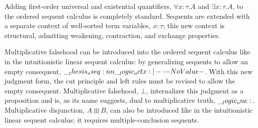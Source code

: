 Adding first-order universal and existential quantifiers, $\forall x{:}\tau.A$ and $\exists x{:}\tau.A$, to the ordered sequent calculus is completely standard.
Sequents are extended with a separate context of well-sorted term variables, $x{:}\tau$; this new context is structural, admitting weakening, contraction, and exchange properties.



Multiplicative falsehood can be introduced into
the ordered sequent calculus like in the intuitionistic linear sequent calculus\autocite{Chang+:CMU03}:
by generalizing %
sequents to %
allow
an empty consequent, $\oseq{\octx |- \cdot}$.
With this new judgment form, the cut principle and left rules must be revised to allow the empty consequent.
% 
Multiplicative falsehood, $\bot$, internalizes this judgment as a proposition and is, as its name suggests, dual to multiplicative truth, $\__logic_one:$.
Multiplicative disjunction, $A \boxplus B$, can also be introduced like in the intuitionistic linear sequent calculus\autocite{Chang+:CMU03}; it requires multiple-conclusion sequents.

